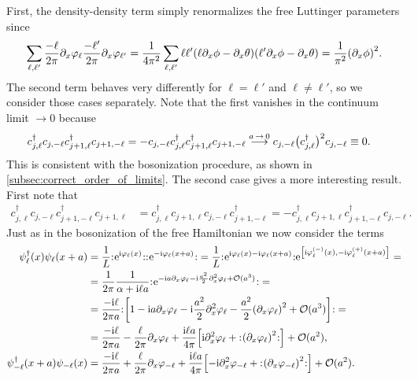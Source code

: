 \documentclass[english, parskip=full]{scrartcl}
\begin{document}
First, the density-density term simply renormalizes the free Luttinger parameters since
\begin{align}
\sum_{\ell,\ell'} \frac{-\ell}{2\pi} \partial_x\varphi_\ell \frac{-\ell'}{2\pi} \partial_x\varphi_{\ell'} = \frac{1}{4\pi^2} \sum_{\ell,\ell'} \ell \ell' \kla*{\ell \partial_x\phi - \partial_x\theta} \kla*{\ell' \partial_x\phi - \partial_x\theta} = \frac{1}{\pi^2} \kla*{\partial_x\phi}^2.
\end{align}
The second term behaves very differently for $\ell=\ell'$ and $\ell\neq\ell'$, so we consider those cases separately.
Note that the first vanishes in the continuum limit $\rightarrow 0$ because
\begin{align}
c_{j,\ell}^\dagger c_{j,-\ell} c_{j+1,\ell}^\dagger c_{j+1,-\ell} &= - c_{j,-\ell} c_{j,\ell}^\dagger c_{j+1,\ell}^\dagger c_{j+1,-\ell} \overset{a\,\rightarrow\,0}{\longrightarrow} c_{j,-\ell} \kla[\big]{c_{j,\ell}^\dagger}^2 c_{j,-\ell} \equiv 0.
\end{align}
This is consistent with the bosonization procedure, as shown in \autoref{subsec:correct_order_of_limits}.
The second case gives a more interesting result.
First note that
\begin{align}
c_{j,\ell}^\dagger c_{j,-\ell} c_{j+1,-\ell}^\dagger c_{j+1,\ell} &= c_{j,\ell}^\dagger c_{j+1,\ell} c_{j,-\ell} c_{j+1,-\ell}^\dagger = - c_{j,\ell}^\dagger c_{j+1,\ell} c_{j+1,-\ell}^\dagger c_{j,-\ell}.
\end{align}
Just as in the bosonization of the free Hamiltonian we now consider the terms
\begin{align}
\psi_\ell^\dagger(x) \psi_\ell(x+a) &= \frac{1}{L} \normord{\powe{\i\varphi_\ell(x)}} \normord{\powe{-\i\varphi_\ell(x+a)}} = \frac{1}{L} \normord{\powe{ \i\varphi_\ell(x) - \i\varphi_\ell(x+a)}} \powe{\klb*{\i\varphi_\ell^{(-)}(x), -\i\varphi_\ell^{(+)}(x+a)}} = \\
&= \frac{1}{2\pi} \frac{1}{\alpha +\i\ell a} \normord{\powe{-\i a\partial_x\varphi_\ell - \i \frac{a^2}{2} \partial_x^2\varphi_\ell + \mathcal{O}(a^3)}} = \\
&= \frac{-\i\ell }{2\pi a} \normord{\klb*{1 - \i a\partial_x\varphi_\ell - \i\frac{a^2}{2} \partial_x^2\varphi_\ell - \frac{a^2}{2}\kla*{\partial_x\varphi_\ell}^2 + \mathcal{O}(a^3)}} = \\
&= \frac{-\i\ell}{2\pi a} - \frac{\ell}{2\pi} \partial_x\varphi_\ell + \frac{\i\ell a}{4\pi} \klb*{\i\partial_x^2\varphi_\ell + \normord{\kla*{\partial_x\varphi_\ell}^2}} + \mathcal{O}(a^2),\\
\psi_{-\ell}^\dagger(x+a) \psi_{-\ell}(x) &= \frac{-\i\ell }{2\pi a} + \frac{\ell}{2\pi} \partial_x\varphi_{-\ell} + \frac{\i\ell a}{4\pi} \klb*{-\i\partial_x^2\varphi_{-\ell} + \normord{\kla*{\partial_x\varphi_{-\ell}}^2}} + \mathcal{O}(a^2).
\end{align}
\end{document}
